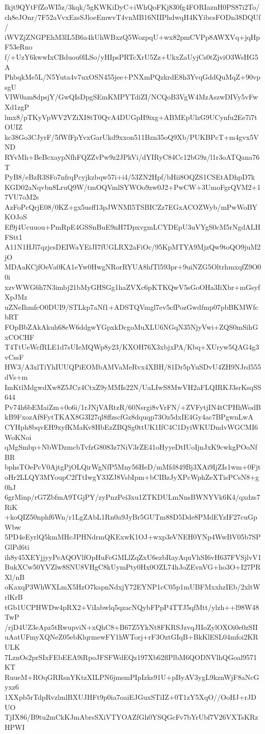 Ikjt9QYtFfZoWI5z/3kqk/5gKWKiDyC+iWhQoFKj830fg4FORIaznH0PS87i2To/
ch8eJOnr/7F52aVvxEzsSJloeEmwvT4vnMB16NIIPhdwqH4KYibcsFODn38DQUf/
iWVZjZNGPEhM3lL5B6a4kUhWBxzQ5WozpqU+wx82pmCVPp8AWXVq+jqHpF53eRno
f/+UzY6kwwIxCBduou0lLSo/yHIpsPRTcXrU5Zz+UkxZaUyjCs0tZjviO3WsHG5A
PhbqkMe5L/N5Yuta4v7uxOSN455jee+PNXmPQzkrdE8h3YvqGddQuMqZ+90vpsgU
VIW0am8dpsjY/GwQIsDpgSEmKMPYTdiZI/NCQoB3VgW4MzAszwDIVy5vFwXd1zgP
lmx8/pTKyVpWV2VZiXI8tT0QvA4DUGpH9ixg+ABMEpUlzG9UCynfu2Ee7i7tOUIZ
kc38Go3CJyrF/5fWfFpYvxGarUkd9xxon511Bzn35oQ9Xb/PUKBPcT+m4gvx5VND
RYvMh+BeBcxaypNfhFQZZvPw9z2JPkVi/dYIRyC84Cc12bG9z/l1r3oATQana76T
PyB8/eBzR3SFo7nfrqPcyjkzbqw57i+i4/53ZN2Hpf/bHii8OQZS1CSEtADhpD7k
KGD02aNqvbn8LruQ9W/tmOQVmlSYWOo9zw0J2+PwCW+3UmoFgrQVM2+17VU7oM2s
AzFoPcQrjE08/0KZ+gx5usff13pJWNMl5TSBICZz7EGxACOZWyb/mPwWoBYKOJoS
Ef9j4Ucuuou+PmRpE4GSSnBuE9nH7DpxvgmLCYDEpU3uVYgS0cM5rNgdALHFStt1
A11N1HJl7qzjcsDEIWaYEiJI7fUGLRX2aFiOc/95KpMTYA9MjzQw9toQO9juM2jO
MDAaKCjfOeVa0KA1eYw0HwgNRorRYUA8hfTl593pr+9uiNZG5OltrhmxqfZ9O00i
xzvWWG6h7N3imbj21bMyGHSGg1haZVXc6pKTKQwV5sGoOHa3IiXbr+mGsyfXpJMz
uZNeIhmfcO0DUI9/STLkp7aNf1+ADSTQVmgl7ev5cfPozGwdfmp07pbBKMWfcbRT
FOpBbZAkAkuh68eW6ddgwYGpxkDcgoMuXLU6NGqN35NjyVwi+ZQS0mSihGxCOCHF
T4TtUeWcfRLE1d7sUIeMQWp8y23/KXOH76X3xbjxPA/Kbq+XUryw5QAG4g3vCssF
HW3/A3xlTiYhIUUQPiEOMbAMVaMeRvx4XBH/81Dr5pYuSDvU4ZH9NJrd555dVs+m
ImKtlMdgwdXw8Z5JCz4CtxZ9yMMIs22N/UaLIwS8MwVH2aFLQIRKJ3srKsqSS644
Pv74h6bEMaiZm+0o6i/1rJNjVARtzR/60Nsrgi8vVrFN/+ZVFytjIN4tCPHhWodB
kB9FxozAf8FytTKAX8G3I27ql8ffzscfGz8dquqp73Oz5dxIE4Gy4ac7BPgwnLwA
CYHph8bqvEH9xyfKMaKv8HbEzZBQSg0ttUK1IfC4C1DyiWKUDndvWGCMI6WoKNoi
qMgSmbp+NbWDzmcbTvfzG8083z7NiV3rZE41oHyyeDtIUoIjnJxK9cwkgPOoNfBR
bphsTOePcV0AjtgPjOLQirWgNfP5Mny56HeD/mMfd849Bj3XAi9IjZIs1wm+0Fjt
oHr2LLQY3MYoupC2fTtIwgY33ZJ8VsbIpm+bCIBzJyXPcWphZeXTisPCsN8+g0hJ
6grMinp/rG7ZbfmA9TGjPY/zyPnzPei3xu1ZTKDULmNnsBWNYVk6K4/qxdzs7RiK
+koQIZ50nphf6Wn/r1LgZAbL1Rn0a9JyBr5GUTm88D5Dde8PMdEYzIF27cuGpWbw
5PD4eEyrlQ5kmMHcJPHNdrmQKExwK1OJ+wxp3eVNEH0YNp4WwBV05b7SPGlPd6ti
ih8y45XEYjjyyPeAQOVlfOpHuFeGMLlZqZxU6ezbRayAquVhSI6vH637FVSjlvV1
BukXCw50YVZlw8SNU8VHgC8kUymPty0Hx0OZL74hJoZEvnVG+ho3O+I27PRXl/nB
oKaxqP3WhWXLmX5HzO7kapnNdxjY72EYNP1cC05p1mUBFMxxhzIEb/2xltWrlKrB
tGb1UCPHWDw4pRX2+ViIabwlq5qzacNQybFPpP4TTJ5qfMtt/ylzh++l98W48TwP
/rjD4UZ3eApz5tRwupviN+xQhC8+B67Z5YkNt8FKRSJzvqJIIoZylOXOi0e0zSII
uAatUFmyXQNeZ05ebKlqrmewFY1hWTorj+rF3OztGIqB+BkKlESL04mfoi2KRULK
7LznOs2prSIxFEbEEA9iRpoJFSFWdEQz197Xb62flPlbM6QODNVlhQGoal9571KT
RuueM+ROqGRRsnYKtzXILPN6jmsmPIpIzks91U+pByAV3ygL9kznWjF8aNcGyxz6
1XXpb5rTdpRvzlmlBXUJHFt9p0ia7oaiEJGuxSTiIZ+0T1zY5XqO//OoHJ+rJDUO
TjIX86/B9tu2mCkKJmAbrsSXiVTYOAZfGh0YSQGcFv7bYrUbf7V26VXTsKRzHPWI
